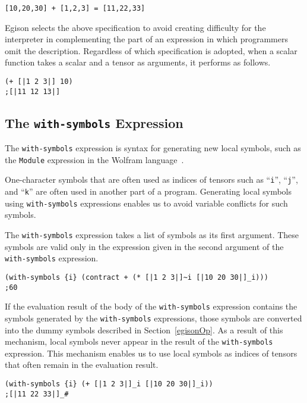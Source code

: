 \documentclass[acmlarge]{acmart}
\begin{document}
{\footnotesize
\begin{verbatim}
[10,20,30] + [1,2,3] = [11,22,33]
\end{verbatim}
}

Egison selects the above specification to avoid creating difficulty for the interpreter in complementing the part of an expression in which programmers omit the description.
Regardless of which specification is adopted, when a scalar function takes a scalar and a tensor as arguments, it performs as follows.

{\footnotesize
\begin{verbatim}
(+ [|1 2 3|] 10)
;[|11 12 13|]
\end{verbatim}
}

\subsection{The \texttt{with-symbols} Expression}\label{withSymbols}

The \texttt{with-symbols} expression is syntax for generating new local symbols, such as the \texttt{Module} expression in the Wolfram language~\cite{wolframModule}.

One-character symbols that are often used as indices of tensors such as ``\texttt{i}'', ``\texttt{j}'', and ``\texttt{k}'' are often used in another part of a program.
Generating local symbols using \texttt{with-symbols} expressions enables us to avoid variable conflicts for such symbols.

The \texttt{with-symbols} expression takes a list of symbols as its first argument.
These symbols are valid only in the expression given in the second argument of the \texttt{with-symbols} expression.

{\footnotesize
\begin{verbatim}
(with-symbols {i} (contract + (* [|1 2 3|]~i [|10 20 30|]_i)))
;60
\end{verbatim}
}

If the evaluation result of the body of the \texttt{with-symbols} expression contains the symbols generated by the \texttt{with-symbols} expressions, those symbols are converted into the dummy symbols described in Section~\ref{egisonOp}.
As a result of this mechanism, local symbols never appear in the result of the \texttt{with-symbols} expression.
This mechanism enables us to use local symbols as indices of tensors that often remain in the evaluation result.

{\footnotesize
\begin{verbatim}
(with-symbols {i} (+ [|1 2 3|]_i [|10 20 30|]_i))
;[|11 22 33|]_#
\end{verbatim}
}
\end{document}
